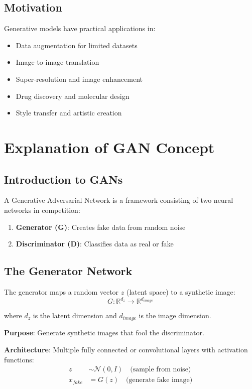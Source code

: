 \documentclass[12pt,a4paper]{article}
\begin{document}
\subsection{Motivation}
Generative models have practical applications in:
\begin{itemize}
    \item Data augmentation for limited datasets
    \item Image-to-image translation
    \item Super-resolution and image enhancement
    \item Drug discovery and molecular design
    \item Style transfer and artistic creation
\end{itemize}

\section{Explanation of GAN Concept} \label{sec:concept}

\subsection{Introduction to GANs}
A Generative Adversarial Network is a framework consisting of two neural networks in competition:

\begin{enumerate}
    \item \textbf{Generator (G)}: Creates fake data from random noise
    \item \textbf{Discriminator (D)}: Classifies data as real or fake
\end{enumerate}

\subsection{The Generator Network}

The generator maps a random vector $z$ (latent space) to a synthetic image:
\[
G: \mathbb{R}^{d_z} \to \mathbb{R}^{d_{image}}
\]

where $d_z$ is the latent dimension and $d_{image}$ is the image dimension.

\textbf{Purpose}: Generate synthetic images that fool the discriminator.

\textbf{Architecture}: Multiple fully connected or convolutional layers with activation functions:
\begin{align}
    z &\sim \mathcal{N}(0, I) \quad \text{(sample from noise)} \\
    x_{fake} &= G(z) \quad \text{(generate fake image)}
\end{align}
\end{document}

